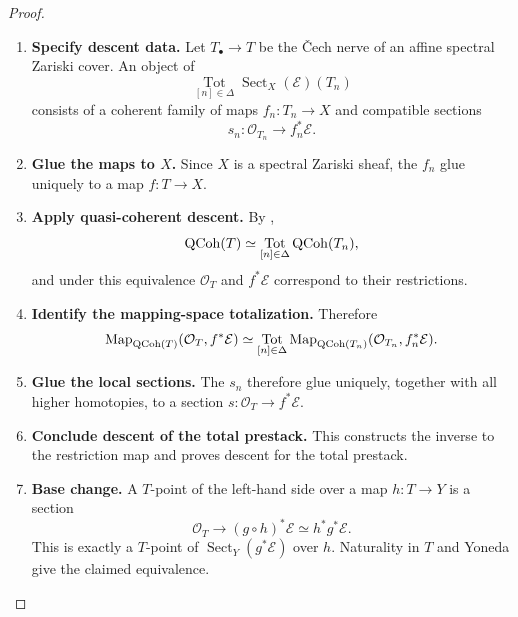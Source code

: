 \begin{proof}
\leavevmode
\begin{enumerate}[label=\textup{(\arabic*)}]
    \item \textbf{Specify descent data.}
    Let \(T_\bullet\to T\) be the \v{C}ech nerve of an affine spectral
    Zariski cover. An object of
    \[
        \operatorname*{Tot}_{[n]\in\Delta}
        \operatorname{Sect}_X(\mathcal E)(T_n)
    \]
    consists of a coherent family of maps \(f_n:T_n\to X\) and compatible
    sections
    \[
        s_n:\mathcal O_{T_n}\longrightarrow f_n^*\mathcal E.
    \]

    \item \textbf{Glue the maps to \(X\).}
    Since \(X\) is a spectral Zariski sheaf, the \(f_n\) glue uniquely to a
    map \(f:T\to X\).

    \item \textbf{Apply quasi-coherent descent.}
    By ,
    \[
        \operatorname{QCoh}(T)
        \simeq
        \operatorname*{Tot}_{[n]\in\Delta}\operatorname{QCoh}(T_n),
    \]
    and under this equivalence \(\mathcal O_T\) and \(f^*\mathcal E\)
    correspond to their restrictions.

    \item \textbf{Identify the mapping-space totalization.}
    Therefore
    \[
        \operatorname{Map}_{\operatorname{QCoh}(T)}(\mathcal O_T,f^*\mathcal E)
        \simeq
        \operatorname*{Tot}_{[n]\in\Delta}
        \operatorname{Map}_{\operatorname{QCoh}(T_n)}
        (\mathcal O_{T_n},f_n^*\mathcal E).
    \]

    \item \textbf{Glue the local sections.}
    The \(s_n\) therefore glue uniquely, together with all higher homotopies, to a
    section \(s:\mathcal O_T\to f^*\mathcal E\).

    \item \textbf{Conclude descent of the total prestack.}
    This constructs the
    inverse to the restriction map and proves descent for the total prestack.

    \item \textbf{Base change.}
    A \(T\)-point of the left-hand side over a map \(h:T\to Y\) is a section
    \[
        \mathcal O_T
        \longrightarrow
        (g\circ h)^*\mathcal E
        \simeq
        h^*g^*\mathcal E.
    \]
    This is exactly a \(T\)-point of
    \(\operatorname{Sect}_Y(g^*\mathcal E)\) over \(h\). Naturality in
    \(T\) and Yoneda give the claimed equivalence.
\end{enumerate}
\end{proof}

